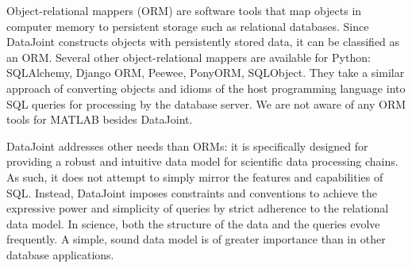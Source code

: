 \documentclass[10pt,letterpaper]{article}
\begin{document}
Object-relational mappers (ORM) are software tools that map objects in computer memory to persistent storage such as relational databases.
Since DataJoint constructs objects with persistently stored data, it can be classified as an ORM.
Several other object-relational mappers are available for Python: SQLAlchemy, Django ORM, Peewee, PonyORM, SQLObject.
They take a similar approach of converting objects and idioms of the host programming language into SQL queries for processing by the database server.
We are not aware of any ORM tools for MATLAB besides DataJoint.

DataJoint addresses other needs than ORMs: it is specifically designed for providing a robust and intuitive data model for scientific data processing chains.
As such, it does not attempt to simply mirror the features and capabilities of SQL.
Instead, DataJoint imposes constraints and conventions to achieve the expressive power and simplicity of queries by strict adherence to the relational data model.
In science, both the structure of the data and the queries evolve frequently. 
A simple, sound data model is of greater importance than in other database applications.
\end{document}

